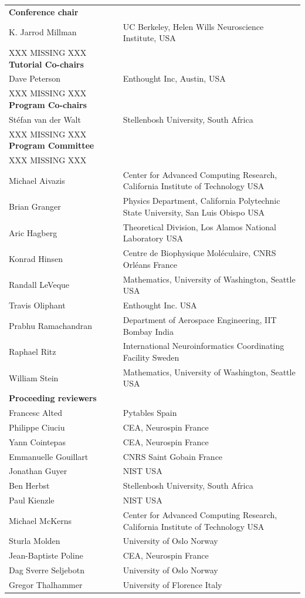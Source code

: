 \def\bfsf{\bfseries\sffamily }

\begin{tabular}{p{3.7cm}p{}}
{\bfsf Conference chair}&\\
K. Jarrod Millman & UC Berkeley, Helen Wills Neuroscience Institute, {\sc
USA}\\
XXX MISSING XXX
\smallskip
{\bfsf Tutorial Co-chairs}&\\
Dave Peterson & Enthought Inc, Austin, {\sc USA}\\
XXX MISSING XXX
\smallskip
{\bfsf Program Co-chairs}&\\
St\'efan van der Walt & Stellenbosh University, {\sc South Africa}\\
XXX MISSING XXX
\smallskip
{\bfsf Program Committee}&\\
XXX MISSING XXX\\
Michael Aivazis & Center for Advanced Computing Research, California
Institute of Technology {\sc USA}\\
Brian Granger & Physics Department, California Polytechnic State
University, San Luis Obispo {\sc USA} \\
Aric Hagberg & Theoretical Division, Los Alamos National Laboratory
{\sc USA} \\
Konrad Hinsen & Centre de Biophysique Mol\'eculaire, CNRS Orl\'eans {\sc
France} \\
Randall LeVeque & Mathematics, University of Washington, Seattle {\sc
USA}\\
Travis Oliphant & Enthought Inc. {\sc USA} \\
Prabhu Ramachandran & Department of Aerospace Engineering, IIT Bombay
{\sc India}\\
Raphael Ritz & International Neuroinformatics Coordinating Facility
{\sc Sweden}\\
William Stein & Mathematics, University of Washington, Seattle {\sc USA}\\
\smallskip
{\bfsf Proceeding reviewers}&\\
Francesc Alted & Pytables {\sc Spain}\\
Philippe Ciuciu & CEA, Neurospin {\sc France}\\
Yann Cointepas &  CEA, Neurospin {\sc France}\\
Emmanuelle Gouillart & CNRS Saint Gobain {\sc France}\\
Jonathan Guyer & NIST {\sc USA}\\
Ben Herbst & Stellenbosh University, {\sc South Africa}\\ 
Paul Kienzle & NIST {\sc USA}\\
Michael McKerns & Center for Advanced Computing Research, California
Institute of Technology {\sc
USA}\\
Sturla Molden & University of Oslo {\sc Norway}\\
Jean-Baptiste Poline  &  CEA, Neurospin {\sc France}\\
Dag Sverre Seljebotn & University of Oslo {\sc Norway}\\
Gregor Thalhammer & University of Florence {\sc Italy}\\
\end{tabular}

\pagestyle{fancy}
\resethandings
\cleardoublepage 
\markright{}{}
\markbox{}{}
\pagestyle{fancy}
\resethandings


